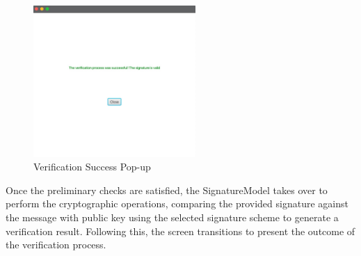 \documentclass[]{final_report}
\theoremstyle{definition}
\begin{document}
\begin{figure}[H]
    \centering
    \includegraphics[width=0.55\textwidth]{poc_pictures/verifyTrue.png}
    \caption{Verification Success Pop-up}
\end{figure}

Once the preliminary checks are satisfied, the SignatureModel takes over to perform the cryptographic operations, comparing the provided signature against the message with public key using the selected signature scheme to generate a verification result. Following this, the screen transitions to present the outcome of the verification process. 
\end{document}
